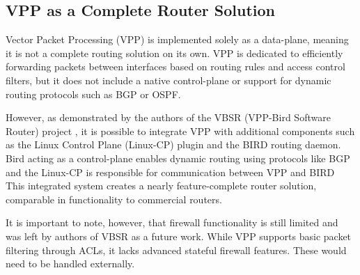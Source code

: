 \subsection{VPP as a Complete Router Solution}
Vector Packet Processing (VPP) is implemented solely as a data-plane, meaning it is not a complete routing solution on its own. 
VPP is dedicated to efficiently forwarding packets between interfaces based on routing rules and access control filters, 
but it does not include a native control-plane or support for dynamic routing protocols such as BGP or OSPF.

However, as demonstrated by the authors of the VBSR (VPP-Bird Software Router) project \cite{10819057}, 
it is possible to integrate VPP with additional components such as the Linux Control Plane (Linux-CP) plugin and the BIRD routing daemon. 
Bird acting as a control-plane enables dynamic routing using protocols like BGP 
and the Linux-CP is responsible for communication between VPP and BIRD 
This integrated system creates a nearly feature-complete router solution, comparable in functionality to commercial routers.

It is important to note, however, that firewall functionality is still limited and was left by authors of VBSR as a future work.\cite{10819057} 
While VPP supports basic packet filtering through ACLs, it lacks advanced stateful firewall features\cite{fdio-vpp-features-2502}. These would need to be handled externally.

